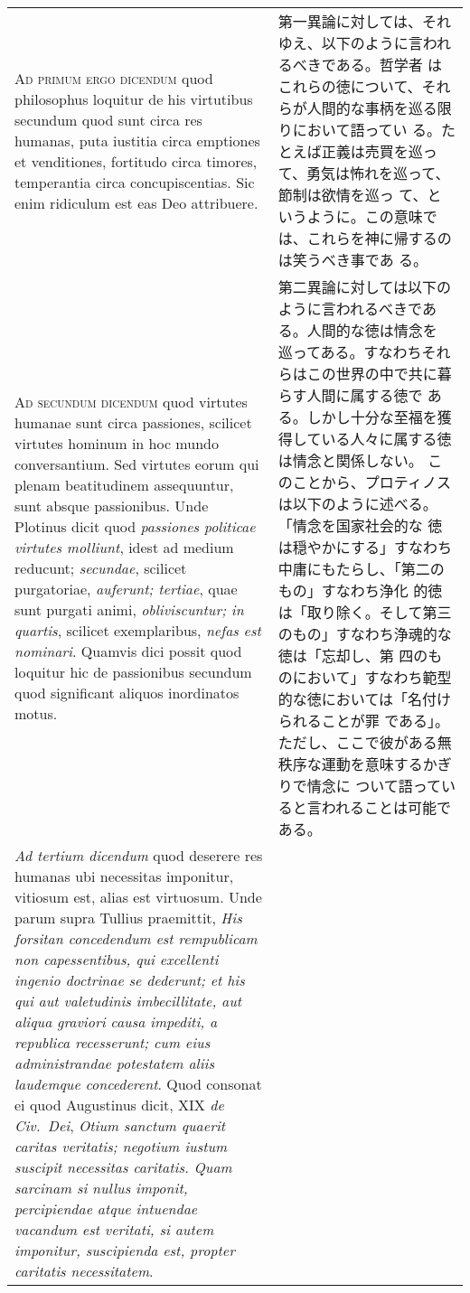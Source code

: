 \documentclass[10pt]{jsarticle}
\begin{document}
\begin{longtable}{p{21em}p{21em}}
\\


{\scshape Ad primum ergo dicendum} quod philosophus loquitur de his
virtutibus secundum quod sunt circa res humanas, puta iustitia circa
emptiones et venditiones, fortitudo circa timores, temperantia circa
concupiscentias. Sic enim ridiculum est eas Deo attribuere.

&

 第一異論に対しては、それゆえ、以下のように言われるべきである。哲学者
 はこれらの徳について、それらが人間的な事柄を巡る限りにおいて語ってい
 る。たとえば正義は売買を巡って、勇気は怖れを巡って、節制は欲情を巡っ
 て、というように。この意味では、これらを神に帰するのは笑うべき事であ
 る。

 
\\



{\scshape Ad secundum dicendum} quod virtutes humanae sunt circa
passiones, scilicet virtutes hominum in hoc mundo conversantium. Sed
virtutes eorum qui plenam beatitudinem assequuntur, sunt absque
passionibus. Unde Plotinus dicit quod {\itshape passiones politicae
virtutes molliunt}, idest ad medium reducunt; {\itshape secundae},
scilicet purgatoriae, {\itshape auferunt; tertiae}, quae sunt purgati
animi, {\itshape obliviscuntur; in quartis}, scilicet exemplaribus,
{\itshape nefas est nominari}. Quamvis dici possit quod loquitur hic
de passionibus secundum quod significant aliquos inordinatos motus.


&

 第二異論に対しては以下のように言われるべきである。人間的な徳は情念を
 巡ってある。すなわちそれらはこの世界の中で共に暮らす人間に属する徳で
 ある。しかし十分な至福を獲得している人々に属する徳は情念と関係しない。
 このことから、プロティノスは以下のように述べる。「情念を国家社会的な
 徳は穏やかにする」すなわち中庸にもたらし、「第二のもの」すなわち浄化
 的徳は「取り除く。そして第三のもの」すなわち浄魂的な徳は「忘却し、第
 四のものにおいて」すなわち範型的な徳においては「名付けられることが罪
 である」。ただし、ここで彼がある無秩序な運動を意味するかぎりで情念に
 ついて語っていると言われることは可能である。
 
\\

{\itshape Ad tertium dicendum} quod deserere res humanas ubi
necessitas imponitur, vitiosum est, alias est virtuosum. Unde parum
supra Tullius praemittit, {\itshape His forsitan concedendum est
rempublicam non capessentibus, qui excellenti ingenio doctrinae se
dederunt; et his qui aut valetudinis imbecillitate, aut aliqua
graviori causa impediti, a republica recesserunt; cum eius
administrandae potestatem aliis laudemque concederent}. Quod consonat
ei quod Augustinus dicit, XIX {\itshape de Civ.~Dei}, {\itshape Otium
sanctum quaerit caritas veritatis; negotium iustum suscipit necessitas
caritatis. Quam sarcinam si nullus imponit, percipiendae atque
intuendae vacandum est veritati, si autem imponitur, suscipienda est,
propter caritatis necessitatem}.



\end{longtable}
\end{document}
